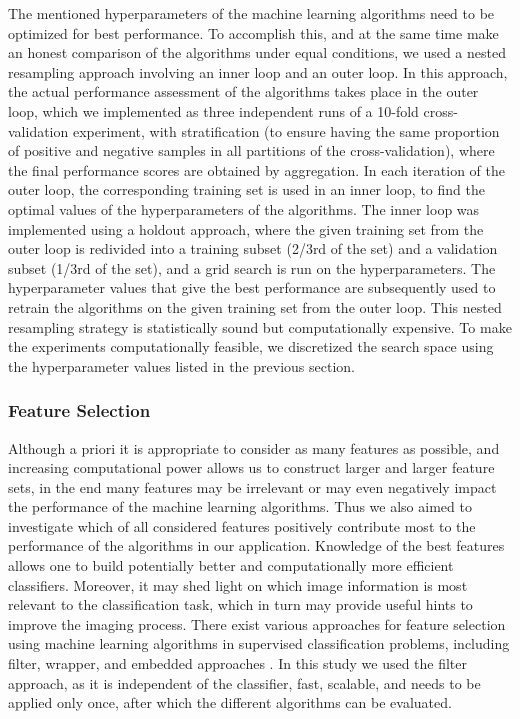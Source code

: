 The mentioned hyperparameters of the machine learning algorithms need to be optimized for best performance. To accomplish this, and at the same time make an honest comparison of the algorithms under equal conditions, we used a nested resampling approach \cite{Simon2007, Bischl:2012:RMM:2261317.2261322} involving an inner loop and an outer loop. In this approach, the actual performance assessment of the algorithms takes place in the outer loop, which we implemented as three independent runs of a 10-fold cross-validation experiment, with stratification (to ensure having the same proportion of positive and negative samples in all partitions of the cross-validation), where the final performance scores are obtained by aggregation. In each iteration of the outer loop, the corresponding training set is used in an inner loop, to find the optimal values of the hyperparameters of the algorithms. The inner loop was implemented using a holdout approach, where the given training set from the outer loop is redivided into a training subset (2/3rd of the set) and a validation subset (1/3rd of the set), and a grid search is run on the hyperparameters. The hyperparameter values that give the best performance are subsequently used to retrain the algorithms on the given training set from the outer loop. This nested resampling strategy is statistically sound but computationally expensive. To make the experiments computationally feasible, we discretized the search space using the hyperparameter values listed in the previous section.

\subsubsection{Feature Selection}
\label{subsubsec:featureSelection}

Although a priori it is appropriate to consider as many features as possible, and increasing  computational power allows us to construct larger and larger feature sets, in the end many features may be irrelevant or may even negatively impact the performance of the machine learning algorithms. Thus we also aimed to investigate which of all considered features positively contribute most to the performance of the algorithms in our application. Knowledge of the best features allows one to build potentially better and computationally more efficient classifiers. Moreover, it may shed light on which image information is most relevant to the classification task, which in turn may provide useful hints to improve the imaging process. There exist various approaches for feature selection using machine learning algorithms in supervised classification problems, including filter, wrapper, and embedded approaches \cite{doi:10.1093/bioinformatics/btm344}. In this study we used the filter approach, as it is independent of the classifier, fast, scalable, and needs to be applied only once, after which the different algorithms can be evaluated.

